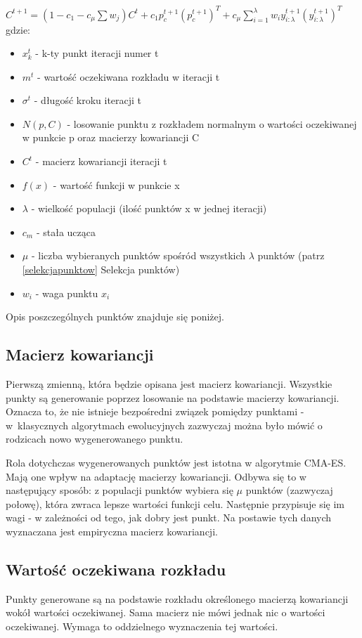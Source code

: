 \documentclass{mini}
\newcommand{\CMAES}{\mbox{CMA-ES}}
\begin{document}
\hspace{8,5ex} $C^{t+1} = (1-c_1-c_\mu\sum{w_j})C^t+c_1p_c^{t+1}{(p_c^{t+1})}^T+c_\mu \sum\limits_{i=1}^\lambda w_iy_{i:\lambda}^{t+1}{(y_{i:\lambda}^{t+1})}^T$
\newline
gdzie:
\begin{itemize}[noitemsep]
\item $x_k^t$ - k-ty punkt iteracji numer t
\item $m^t$ - wartość oczekiwana rozkładu w iteracji t
\item $\sigma^t$ - długość kroku iteracji t
\item $N(p,C)$ - losowanie punktu z rozkładem normalnym o wartości oczekiwanej w punkcie p oraz macierzy kowariancji C
\item $C^t$ - macierz kowariancji iteracji t
\item $f(x)$ - wartość funkcji w punkcie x
\item $\lambda$ - wielkość populacji (ilość punktów x w jednej iteracji)
\item $c_m$ - stała ucząca
\item $\mu$ - liczba wybieranych punktów spośród wszystkich $\lambda$ punktów (patrz \ref{selekcjapunktow} Selekcja punktów)
\item $w_i$ - waga punktu $x_i$
\end{itemize}

Opis poszczególnych punktów znajduje się poniżej.

\subsection{Macierz kowariancji}
Pierwszą zmienną, która będzie opisana jest macierz kowariancji. Wszystkie punkty są generowanie poprzez losowanie na podstawie macierzy kowariancji. Oznacza to, że nie istnieje bezpośredni związek pomiędzy punktami - w~klasycznych algorytmach ewolucyjnych zazwyczaj można było mówić o rodzicach nowo wygenerowanego punktu.

Rola dotychczas wygenerowanych punktów jest istotna w algorytmie \CMAES. Mają one wpływ na adaptację macierzy kowariancji. Odbywa się to w następujący sposób: z populacji punktów wybiera się $\mu$ punktów (zazwyczaj połowę), która zwraca lepsze wartości funkcji celu. Następnie przypisuje się im wagi - w zależności od tego, jak dobry jest punkt. Na postawie tych danych wyznaczana jest empiryczna macierz kowariancji.

\subsection{Wartość oczekiwana rozkładu}
Punkty generowane są na podstawie rozkładu określonego macierzą kowariancji wokół wartości oczekiwanej. Sama macierz nie mówi jednak nic o wartości oczekiwanej. Wymaga to oddzielnego wyznaczenia tej wartości.
\end{document}
